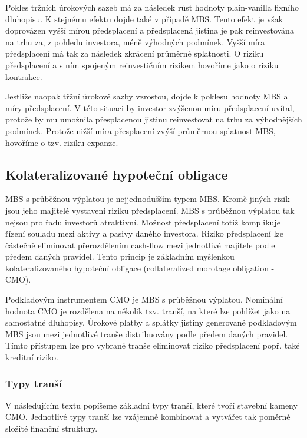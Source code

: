 \documentclass[a4paper]{book}
\begin{document}
Pokles tržních úrokových sazeb má za následek růst hodnoty plain-vanilla fixního dluhopisu. K stejnému efektu dojde také v případě MBS. Tento efekt je však doprovázen vyšší mírou předsplacení a předsplacená jistina je pak reinvestována na trhu za, z pohledu investora, méně výhodných podmínek. Vyšší míra předsplacení má tak za následek zkrácení průměrné splatnosti. O riziku předsplacení a s ním spojeným reinvestičním rizikem hovoříme jako o riziku kontrakce.

Jestliže naopak třžní úrokové sazby vzrostou, dojde k poklesu hodnoty MBS a míry předsplacení. V této situaci by investor zvýšenou míru předsplacení uvítal, protože by mu umožnila přesplacenou jistinu reinvestovat na trhu za výhodnějších podmínek. Protože nižší míra přesplacení zvýší průměrnou splatnost MBS, hovoříme o tzv. riziku expanze.

\subsection{Kolateralizované hypoteční obligace}

MBS s průběžnou výplatou je nejjednodušším typem MBS. Kromě jiných rizik jsou jeho majitelé vystaveni riziku předsplacení. MBS s průběžnou výplatou tak nejsou pro řadu investorů atraktivní. Možnost předsplacení totiž komplikuje řízení souladu mezi aktivy a pasivy daného investora. Riziko předsplacení lze částečně eliminovat přerozdělením cash-flow mezi jednotlivé majitele podle předem daných pravidel. Tento princip je základním myšlenkou kolateralizovaného hypoteční obligace (collateralized morotage obligation - CMO).

Podkladovým instrumentem CMO je MBS s průběžnou výplatou. Nominální hodnota CMO je rozdělena na několik tzv. tranší, na které lze pohlížet jako na samostatné dluhopisy. Úrokové platby a splátky jistiny generované podkladovým MBS jsou mezi jednotlivé tranše distribuovány podle předem daných pravidel. Tímto přístupem lze pro vybrané tranše eliminovat riziko předsplacení popř. také kreditní riziko.

\subsubsection{Typy tranší}

V následujícím textu popíšeme základní typy tranší, které tvoří stavební kameny CMO. Jednotlivé typy tranší lze vzájemně kombinovat a vytvářet tak poměrně složité finanční struktury.\\
\end{document}
